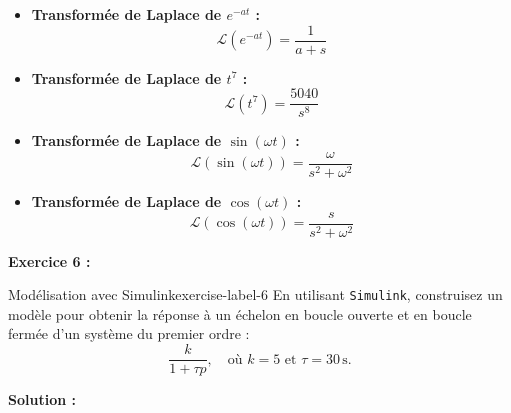 \documentclass{article}
\begin{document}
\begin{itemize}
    \item \textbf{Transformée de Laplace de $e^{-at}$ :}
    \[
    \mathcal{L}(e^{-at}) = \frac{1}{a + s}
    \]

    \item \textbf{Transformée de Laplace de $t^7$ :}
    \[
    \mathcal{L}(t^7) = \frac{5040}{s^8}
    \]

    \item \textbf{Transformée de Laplace de $\sin(\omega t)$ :}
    \[
    \mathcal{L}(\sin(\omega t)) = \frac{\omega}{s^2 + \omega^2}
    \]

    \item \textbf{Transformée de Laplace de $\cos(\omega t)$ :}
    \[
    \mathcal{L}(\cos(\omega t)) = \frac{s}{s^2 + \omega^2}
    \]
\end{itemize}


\newpage

\textsf{\textbf{Exercice 6 :}}
\begin{problem}{Modélisation avec Simulink}{exercise-label-6}
En utilisant \texttt{Simulink}, construisez un mod\`ele pour obtenir la r\'eponse \`a un \'echelon en boucle ouverte et en boucle ferm\'ee d’un syst\`eme du premier ordre :
\[
\frac{k}{1 + \tau p}, \quad \text{où } k = 5 \text{ et } \tau = 30\,\text{s}.
\]
\end{problem}

\textsf{\textbf{Solution :}}
\end{document}

